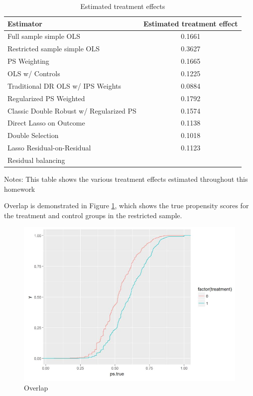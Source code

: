 \documentclass[paper=letter, fontsize=11pt]{scrartcl} %
\begin{document}
\begin{table}[htbp]  \small
 \centering
  \begin{threeparttable}  
\caption{Estimated treatment effects \label{treat}}\begin{tabular}{l*{1}{c}}
\hline
Estimator           &     Estimated treatment effect     
\rule{0pt}{4ex}  \\
\hline\hline
Full sample simple OLS &  0.1661 \\
\hline
Restricted sample simple OLS &  0.3627 \\
PS Weighting          &            0.1665 \\
OLS w/ Controls       &            0.1225 \\ \hline
Traditional DR OLS w/ IPS Weights & 0.0884 \\
Regularized PS Weighted &             0.1792 \\
Classic Double Robust w/ Regularized PS & 0.1574 \\
Direct Lasso on Outcome &   0.1138 \\ \hline
Double Selection       &    0.1018 \\
Lasso Residual-on-Residual & 0.1123 \\
Residual balancing & \\
\end{tabular}
\begin{tablenotes}
\item Notes: This table shows the various treatment effects estimated throughout this homework
    \end{tablenotes}
  \end{threeparttable}
\end{table}

Overlap is demonstrated in Figure \ref{overlap}, which shows the true propensity scores for the treatment and control groups in the restricted sample. 


\begin{figure}[!ht]
\center
\caption{Overlap  \label{overlap}}
\includegraphics[scale=0.8]{figs/overlap.jpg}
\end{figure}
\end{document}
